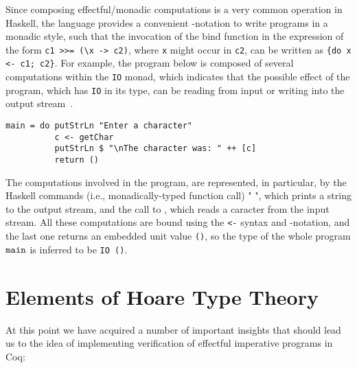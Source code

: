 Since composing effectful/monadic computations is a very common
operation in Haskell, the language provides a convenient -notation
to write programs in a  monadic style, such that
the invocation of the bind function in the expression of the form
\texttt{c1 >>= (\textbackslash x -> c2)}, where \texttt{x} might
occur in \texttt{c2}, can be written as \texttt{\{do x <- c1;
c2\}}.
For example, the program below is composed of several computations
within the \texttt{IO} monad, which indicates that the possible
effect of the program, which has \texttt{IO} in its type, can be
reading from input or writing into the output
stream~\cite{PeytonJones-Wadler:POPL93}.
\newpage
\begin{verbatim}
main = do putStrLn "Enter a character"
          c <- getChar 
          putStrLn $ "\nThe character was: " ++ [c] 
          return ()
\end{verbatim}
The computations involved in the program, are represented, in
particular, by the Haskell commands (i.e., monadically-typed function
call)  "  ", which prints a string to the
output stream, and the call to , which reads a caracter from
the input stream. All these computations are bound using the
\texttt{<-} syntax and -notation, and the last one returns an
embedded unit value \texttt{()}, so the type of the whole program
$\mathtt{main}$ is inferred to be \texttt{IO~()}.
\section{Elements of Hoare Type Theory}


\label{sec:htt-intro}
At this point we have acquired a number of important insights that
should lead us to the idea of implementing verification of effectful
imperative programs in Coq:

